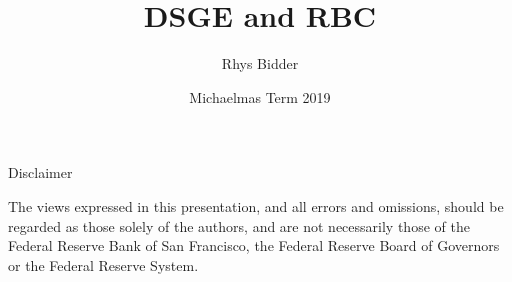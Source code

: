\documentclass{beamer}
\begin{document}
\title[DSGE and RBC]{DSGE and RBC}
\author[Bidder]{Rhys Bidder}
\date{Michaelmas Term 2019}
\maketitle


\begin{frame}{Disclaimer}

The views expressed in this presentation, and all errors and omissions, should be regarded as those solely of the authors, and are not necessarily those of the Federal Reserve Bank of San Francisco, the Federal Reserve Board of Governors or the Federal Reserve System.

\end{frame}






\end{document}
